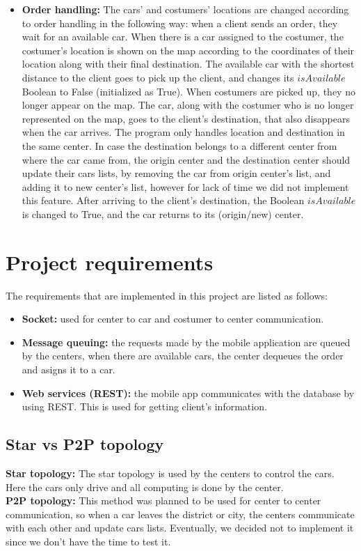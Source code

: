 \documentclass[a4paper]{article}
\begin{document}
\begin{itemize}
    \item \textbf{Order handling:} The cars' and costumers' locations are changed according to order handling in the following way: when a client sends an order, they wait for an available car. When there is a car assigned to the costumer, the costumer's location is shown on the map according to the coordinates of their location along with their final destination. The available car with the shortest distance to the client goes to pick up the client, and changes its $isAvailable$ Boolean to False (initialized as True). When costumers are picked up, they no longer appear on the map. The car, along with the costumer who is no longer represented on the map, goes to the client's destination, that also disappears when the car arrives. The program only handles location and destination in the same center. In case the destination belongs to a different center from where the car came from, the origin center and the destination center should update their cars lists, by removing the car from origin center's list, and adding it to new center's list, however for lack of time we did not implement this feature. After arriving to the client's destination, the Boolean $isAvailable$ is changed to True, and the car returns to its (origin/new) center.
\end{itemize}

\section*{Project requirements}
The requirements that are implemented in this project are listed as follows:
\begin{itemize}
    \item \textbf{Socket:} used for center to car and costumer to center communication.
    \item \textbf{Message queuing:} the requests made by the mobile application are queued by the centers, when there are available cars, the center dequeues the order and asigns it to a car. 
    \item \textbf{Web services (REST):} the mobile app communicates with the database by using REST. This is used for getting client's information.
\end{itemize}

\subsection*{Star vs P2P topology}
\textbf{Star topology:} The star topology is used by the centers to control the cars. Here the cars only drive and all computing is done by the center.\\
\textbf{P2P topology:} This method was planned to be used for center to center communication, so when a car leaves the district or city, the centers communicate with each other and update cars lists. Eventually, we decided not to implement it since we don't have the time to test it.
\end{document}

